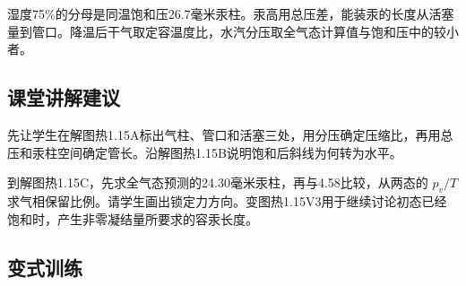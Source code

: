 \documentclass[UTF8,fontset=fandol,a4paper,11pt]{ctexart}
\begin{document}
湿度75\%的分母是同温饱和压26.7毫米汞柱。汞高用总压差，能装汞的长度从活塞量到管口。降温后干气取定容温度比，水汽分压取全气态计算值与饱和压中的较小者。



\subsection*{课堂讲解建议}

先让学生在解图热1.15A标出气柱、管口和活塞三处，用分压确定压缩比，再用总压和汞柱空间确定管长。沿解图热1.15B说明饱和后斜线为何转为水平。

到解图热1.15C，先求全气态预测的24.30毫米汞柱，再与4.58比较，从两态的 $p_v/T$ 求气相保留比例。请学生画出锁定力方向。变图热1.15V3用于继续讨论初态已经饱和时，产生非零凝结量所要求的容汞长度。



\subsection*{变式训练}
\end{document}
